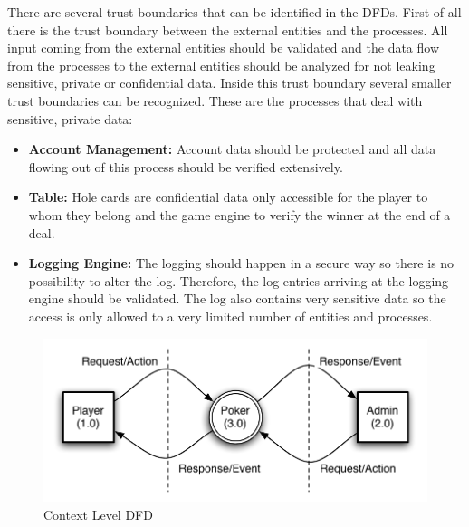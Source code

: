 \documentclass[a4paper,11pt]{report}
\begin{document}
There are several trust boundaries that can be identified in the DFDs. First of all there is the trust boundary between the external entities and the processes. All input coming from the external entities should be validated and the data flow from the processes to the external entities should be analyzed for not leaking sensitive, private or confidential data. Inside this trust boundary several smaller trust boundaries can be recognized. These are the processes that deal with sensitive, private data:
\begin{itemize}
\item \textbf{Account Management:} Account data should be protected and all data flowing out of this process should be verified extensively.
\item \textbf{Table:} Hole cards are confidential data only accessible for the player to whom they belong and the game engine to verify the winner at the end of a deal.
\item \textbf{Logging Engine:} The logging should happen in a secure way so there is no possibility to alter the log. Therefore, the log entries arriving at the logging engine should be validated. The log also contains very sensitive data so the access is only allowed to a very limited number of entities and processes.
\end{itemize}


\begin{figure}[htpb]
  \begin{center}
    \includegraphics[scale=0.8]{context_diagram}
  \end{center}
  \caption{Context Level DFD}\label{fig:context}
\end{figure}
\end{document}
